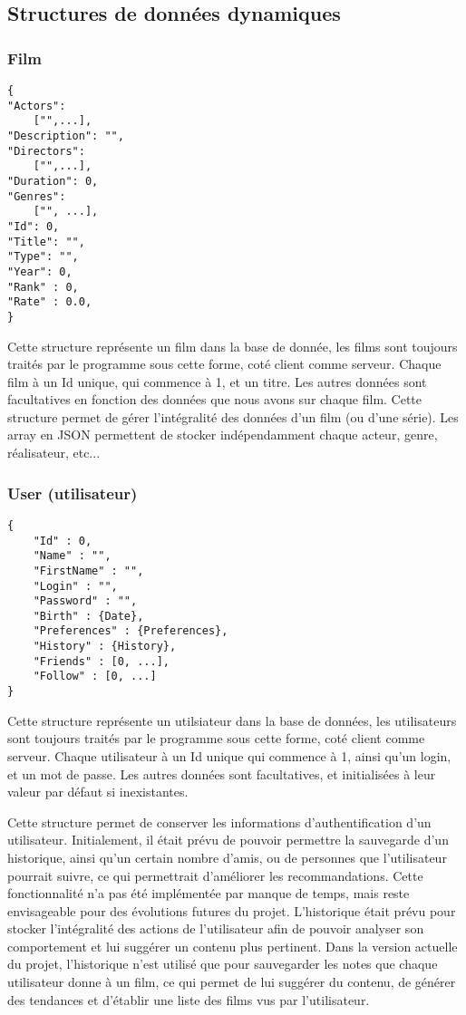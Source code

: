 % 
\subsection{Structures de données dynamiques}
\subsubsection{Film}
\begin{lstlisting}
{
"Actors":
	["",...],
"Description": "",
"Directors":
	["",...],
"Duration": 0,
"Genres":
	["", ...],
"Id": 0,
"Title": "",
"Type": "",
"Year": 0,
"Rank" : 0,
"Rate" : 0.0,
}
\end{lstlisting}
Cette structure représente un film dans la base de donnée, les films sont toujours traités par le programme sous cette forme, coté client comme serveur.
Chaque film à un Id unique, qui commence à 1, et un titre. Les autres données sont facultatives en fonction des données que nous avons sur chaque film.
Cette structure permet de gérer l'intégralité des données d'un film (ou d'une série).
Les array en JSON permettent de stocker indépendamment chaque acteur, genre, réalisateur, etc...
\subsubsection{User (utilisateur)}
\begin{lstlisting}
{
	"Id" : 0,
	"Name" : "",
	"FirstName" : "",
	"Login" : "",
	"Password" : "",
	"Birth" : {Date},
	"Preferences" : {Preferences},
	"History" : {History},
	"Friends" : [0, ...],
	"Follow" : [0, ...]
}
\end{lstlisting}

Cette structure représente un utilsiateur dans la base de données, les utilisateurs sont toujours traités par le programme sous cette forme, coté client comme serveur.
Chaque utilisateur à un Id unique qui commence à 1, ainsi qu'un login, et un mot de passe.
Les autres données sont facultatives, et initialisées à leur valeur par défaut si inexistantes.
\par
Cette structure permet de conserver les informations d'authentification d'un utilisateur.
Initialement, il était prévu de pouvoir permettre la sauvegarde d'un historique, ainsi qu'un certain nombre d'amis, ou de personnes que l'utilisateur pourrait suivre, ce qui permettrait d'améliorer les recommandations.
Cette fonctionnalité n'a pas été implémentée par manque de temps, mais reste envisageable pour des évolutions futures du projet.
L'historique était prévu pour stocker l'intégralité des actions de l'utilisateur afin de pouvoir analyser son comportement et lui suggérer un contenu plus pertinent.
Dans la version actuelle du projet, l'historique n'est utilisé que pour sauvegarder les notes que chaque utilisateur donne à un film, ce qui permet de lui suggérer du contenu, de générer des tendances et d'établir une liste des films vus par l'utilisateur.

